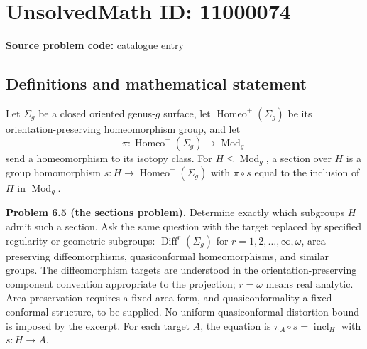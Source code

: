 \documentclass[11pt]{article}
\begin{document}
\section*{UnsolvedMath ID: 11000074}
\textbf{Source problem code:} catalogue entry
\subsection{Definitions and mathematical statement}
Let $\Sigma_g$ be a closed oriented genus-$g$ surface, let $\operatorname{Homeo}^+(\Sigma_g)$ be its orientation-preserving homeomorphism group, and let
\[
 \pi:\operatorname{Homeo}^+(\Sigma_g)\longrightarrow\operatorname{Mod}_g
\]
send a homeomorphism to its isotopy class. For $H\le\operatorname{Mod}_g$, a section over $H$ is a group homomorphism $s:H\to\operatorname{Homeo}^+(\Sigma_g)$ with $\pi\circ s$ equal to the inclusion of $H$ in $\operatorname{Mod}_g$.

\textbf{Problem 6.5 (the sections problem).} Determine exactly which subgroups $H$ admit such a section. Ask the same question with the target replaced by specified regularity or geometric subgroups: $\operatorname{Diff}^r(\Sigma_g)$ for $r=1,2,\ldots,\infty,\omega$, area-preserving diffeomorphisms, quasiconformal homeomorphisms, and similar groups. The diffeomorphism targets are understood in the orientation-preserving component convention appropriate to the projection; $r=\omega$ means real analytic. Area preservation requires a fixed area form, and quasiconformality a fixed conformal structure, to be supplied. No uniform quasiconformal distortion bound is imposed by the excerpt. For each target $A$, the equation is $\pi_A\circ s=\operatorname{incl}_H$ with $s:H\to A$.
\end{document}
